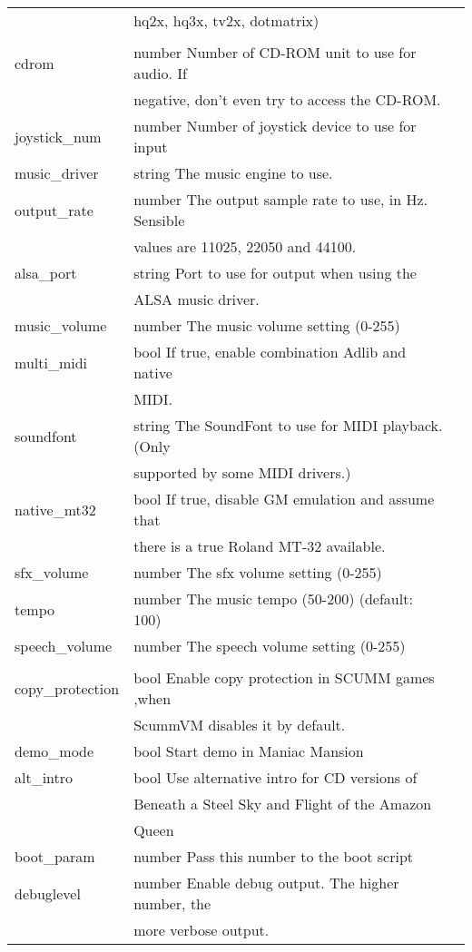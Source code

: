 \begin{tabular}[hf]{lll}
                       &         hq2x, hq3x, tv2x, dotmatrix)\\
\\
        cdrom           &number   Number of CD-ROM unit to use for audio. If\\
                        &         negative, don't even try to access the CD-ROM.\\
        joystick\_num   &number   Number of joystick device to use for input\\
        music\_driver   &string   The music engine to use.\\
        output\_rate    &number   The output sample rate to use, in Hz. Sensible\\
                        &         values are 11025, 22050 and 44100.\\
        alsa\_port      &string   Port to use for output when using the\\
                        &         ALSA music driver.\\
        music\_volume   &number   The music volume setting (0-255)\\
        multi\_midi     &bool     If true, enable combination Adlib and native\\
                        &         MIDI.\\
        soundfont       &string   The SoundFont to use for MIDI playback. (Only\\
                        &         supported by some MIDI drivers.)\\
        native\_mt32    &bool     If true, disable GM emulation and assume that\\
                        &         there is a true Roland MT-32 available.\\
        sfx\_volume     &number   The sfx volume setting (0-255)\\
        tempo           &number   The music tempo (50-200) (default: 100)\\
        speech\_volume  &number   The speech volume setting (0-255)\\
\\
        copy\_protection&bool     Enable copy protection in SCUMM games ,when\\
                        &         ScummVM disables it by default.\\
        demo\_mode      &bool     Start demo in Maniac Mansion\\
        alt\_intro      &bool     Use alternative intro for CD versions of \\
                        &         Beneath a Steel Sky and Flight of the Amazon\\
                        &         Queen
\\
        boot\_param     &number   Pass this number to the boot script\\
        debuglevel      &number   Enable debug output. The higher number, the\\
                        &         more verbose output.\\
\end{tabular}

